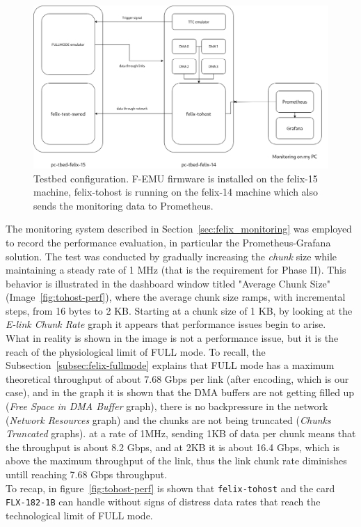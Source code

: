 \begin{figure}[htbp]
\centering
\includegraphics[width=\textwidth]{images/results/tohost-tbed-setup.png}
\caption[Testbed configuration]{Testbed configuration. F-EMU firmware is installed on the felix-15 machine, felix-tohost is running on the felix-14 machine which also sends the monitoring data to Prometheus.}
\label{fig:tbed-setup}
\end{figure}

The monitoring system described in Section~\ref{sec:felix_monitoring} was employed to record the performance evaluation, in particular the Prometheus-Grafana solution. The test was conducted by gradually increasing the \emph{chunk} size while maintaining a steady rate of 1 MHz (that is the requirement for Phase II). This behavior is illustrated in the dashboard window titled "Average Chunk Size" (Image~\ref{fig:tohost-perf}), where the average chunk size ramps, with incremental steps, from 16 bytes to 2 KB. Starting at a chunk size of 1 KB, by looking at the \emph{E-link Chunk Rate} graph it appears that performance issues begin to arise.\\
What in reality is shown in the image is not a performance issue, but it is the reach of the physiological limit of FULL mode. To recall, the Subsection~\ref{subsec:felix-fullmode} explains that FULL mode has a maximum theoretical throughput of about 7.68 Gbps per link (after encoding, which is our case), and in the graph it is shown that the \acs{DMA} buffers are not getting filled up (\emph{Free Space in DMA Buffer} graph), there is no backpressure in the network (\emph{Network Resources} graph) and the chunks are not being truncated (\emph{Chunks Truncated} graphs). at a rate of 1MHz, sending 1KB of data per chunk means that the throughput is about 8.2 Gbps, and at 2KB it is about 16.4 Gbps, which is above the maximum throughput of the link, thus the link chunk rate diminishes untill reaching 7.68 Gbps throughput.\\ 
To recap, in figure~\ref{fig:tohost-perf} is shown that \texttt{felix-tohost} and the card \texttt{FLX-182-1B} can handle without signs of distress data rates that reach the technological limit of FULL mode.

